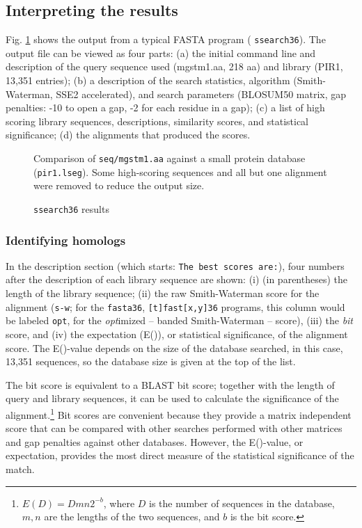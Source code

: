 \documentclass[11pt]{article}
\begin{document}
\subsection{Interpreting the results}

Fig. \ref{ssearch_run} shows the output from a typical FASTA program
( \texttt{ssearch36}).  The output file can be
viewed as four parts: (a) the initial command line and description of
the query sequence used (mgstm1.aa, 218 aa) and library (PIR1, 13,351
entries); (b) a description of the search statistics, algorithm
(Smith-Waterman, SSE2 accelerated), and search parameters (BLOSUM50
matrix, gap penalties: -10 to open a gap, -2 for each residue in a
gap); (c) a list of high scoring library sequences, descriptions, similarity scores, and statistical significance; (d) the alignments that produced the scores.

\begin{figure}

\caption{\label{ssearch_run}\texttt{ssearch36} results}
\vspace{1.0ex}
Comparison of \texttt{seq/mgstm1.aa} against a small protein database
(\texttt{pir1.lseg}). Some high-scoring sequences and all but one
alignment were removed to reduce the output size.
\end{figure}

\subsubsection{Identifying homologs}
In the description section (which starts: \texttt{The best scores
  are:}), four numbers after the description of each library sequence
are shown: (i) (in parentheses) the length of the library sequence;
(ii) the raw Smith-Waterman score for the alignment (\texttt{s-w}; for
the \texttt{fasta36}, \texttt{[t]fast[x,y]36} programs, this column
would be labeled \texttt{opt}, for the \emph{opt}imized -- banded
Smith-Waterman -- score), (iii) the \emph{bit} score, and (iv) the
expectation (E()), or statistical significance, of the alignment
score.  The E()-value depends on the size of the database searched, in
this case, 13,351 sequences, so the database size is given at the top
of the list.

The bit score is equivalent to a BLAST bit score; together with the
length of query and library sequences, it can be used to calculate the
significance of the alignment.\footnote{$E(D) = D m n 2^{-b}$,
where $D$ is the number of sequences in the database, $m, n$ are the
lengths of the two sequences, and $b$ is the bit score.}  Bit scores
are convenient because they provide a matrix independent score that
can be compared with other searches performed with other matrices and
gap penalties against other databases.  However, the E()-value, or
expectation, provides the most direct measure of the statistical
significance of the match.
\end{document}
